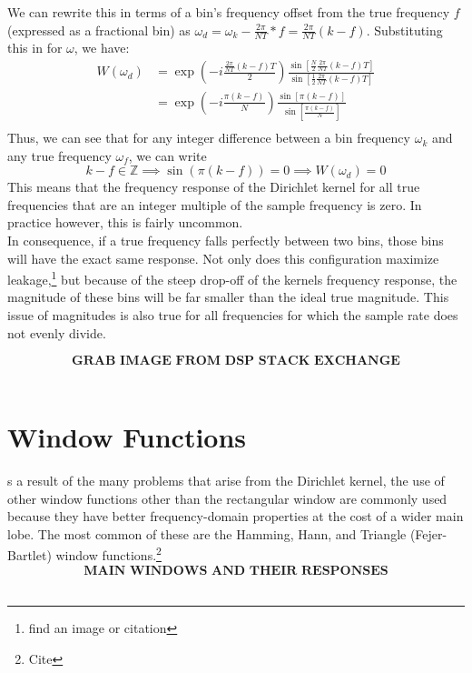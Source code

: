 \documentclass[11pt,twoside]{report}
\numberwithin{thm}{section}
\numberwithin{equation}{section}
\begin{document}
We can rewrite this in terms of a bin's frequency offset from the true frequency $f$ (expressed as a fractional bin) as $\omega_d = \omega_k - \frac{2\pi}{NT}*f = \frac{2\pi}{NT}(k - f)$. Substituting this in for $\omega$, we have:
\begin{align*}
    W(\omega_d) &= \exp{\left(-i\frac{\frac{2\pi}{NT}(k-f) T}{2}\right)}\frac{\displaystyle\sin{\left[\frac{N}{2}\frac{2\pi}{NT}(k-f) T \right]}}{\displaystyle\sin{\left[\frac{1}{2}\frac{2\pi}{NT}(k-f) T \right]}} \\
    &=\exp{\left(-i\frac{\pi (k-f)}{N}\right)}\frac{\sin{\left[\pi (k-f) \right]}}{\sin{\left[\frac{\pi (k-f)}{N} \right]}} \\
\end{align*}
Thus, we can see that for any integer difference between a bin frequency $\omega_k$ and any true frequency $\omega_f$, we can write
$$k-f \in \mathbb{Z} \implies \sin{\left(\pi (k-f)\right)} = 0 \implies W(\omega_d) = 0$$
This means that the frequency response of the Dirichlet kernel for all true frequencies that are an integer multiple of the sample frequency is zero. In practice however, this is fairly uncommon.\\

In consequence, if a true frequency falls perfectly between two bins, those bins will have the exact same response. Not only does this configuration maximize leakage,\footnote{find an image or citation} but because of the steep drop-off of the kernels frequency response, the magnitude of these bins will be far smaller than the ideal true magnitude. This issue of magnitudes is also true for all frequencies for which the sample rate does not evenly divide.

$$\textbf{GRAB IMAGE FROM DSP STACK EXCHANGE}$$\\

\section{Window Functions}

s a result of the many problems that arise from the Dirichlet kernel, the use of other window functions other than the rectangular window are commonly used because they have better frequency-domain properties at the cost of a wider main lobe. The most common of these are the Hamming, Hann, and Triangle (Fejer-Bartlet) window functions.\footnote{Cite}\\

$$\textbf{MAIN WINDOWS AND THEIR RESPONSES}$$\\
\end{document}
